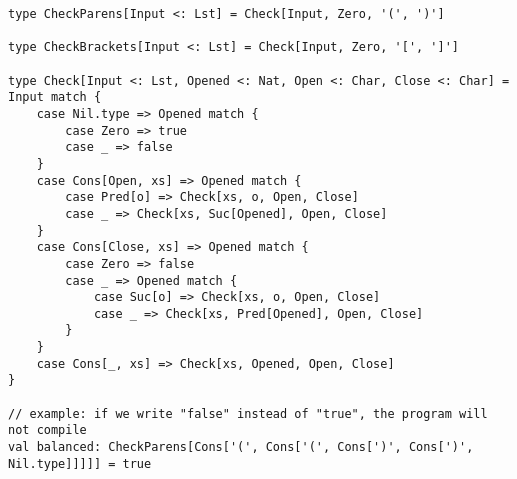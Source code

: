 \begin{lstlisting}[style=myScalastyle, caption={Match types implementation of a delimiter balance checker.}, captionpos=b, label={delim-match}]
type CheckParens[Input <: Lst] = Check[Input, Zero, '(', ')']

type CheckBrackets[Input <: Lst] = Check[Input, Zero, '[', ']']

type Check[Input <: Lst, Opened <: Nat, Open <: Char, Close <: Char] = Input match {
    case Nil.type => Opened match {
        case Zero => true
        case _ => false
    }
    case Cons[Open, xs] => Opened match {
        case Pred[o] => Check[xs, o, Open, Close]
        case _ => Check[xs, Suc[Opened], Open, Close]
    }
    case Cons[Close, xs] => Opened match {
        case Zero => false
        case _ => Opened match {
            case Suc[o] => Check[xs, o, Open, Close]
            case _ => Check[xs, Pred[Opened], Open, Close]
        }
    }
    case Cons[_, xs] => Check[xs, Opened, Open, Close]
}

// example: if we write "false" instead of "true", the program will not compile
val balanced: CheckParens[Cons['(', Cons['(', Cons[')', Cons[')', Nil.type]]]]] = true
\end{lstlisting}

\twocolumn